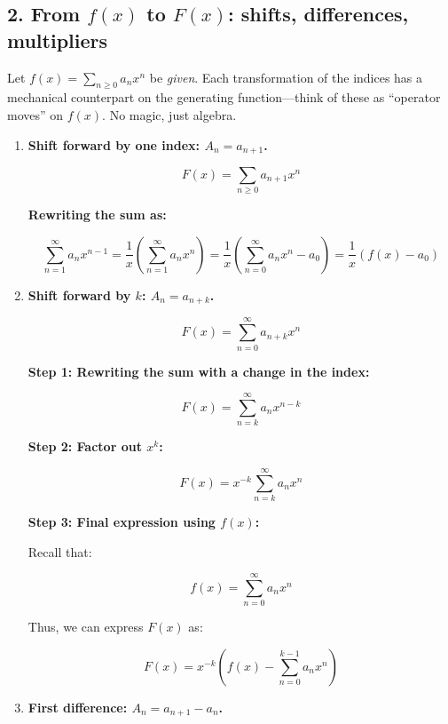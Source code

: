 \documentclass[docmute]{article}
\begin{document}
\subsection*{2. From $f(x)$ to $F(x)$: shifts, differences, multipliers}

Let $f(x)=\sum_{n\ge0} a_{n}x^{n}$ be \emph{given}.  Each transformation of the
indices has a mechanical counterpart on the generating function—think of these
as “operator moves” on $f(x)$.  No magic, just algebra.

\begin{enumerate}[label=\textbf{2(\alph*)}\quad]

\item \textbf{Shift forward by one index: $A_{n}=a_{n+1}$.}

\[
F(x) = \sum_{n \geq 0} a_{n+1} x^n
\]

\textbf{Rewriting the sum as:}

\[
\sum_{n=1}^{\infty} a_n x^{n-1} = \frac{1}{x} \left( \sum_{n=1}^{\infty} a_n x^n \right) = \frac{1}{x} \left( \sum_{n=0}^{\infty} a_n x^n - a_0 \right)= \frac{1}{x} \left( f(x) - a_0 \right)
\]

\medskip\item \textbf{Shift forward by $k$: $A_{n}=a_{n+k}$.}

\[
F(x) = \sum_{n=0}^{\infty} a_{n+k} x^n
\]

\textbf{Step 1: Rewriting the sum with a change in the index:}

\[
F(x) = \sum_{n=k}^{\infty} a_n x^{n-k}
\]

\textbf{Step 2: Factor out \(x^k\):}

\[
F(x) = x^{-k} \sum_{n=k}^{\infty} a_n x^n
\]

\textbf{Step 3: Final expression using \(f(x)\):}

Recall that:

\[
f(x) = \sum_{n=0}^{\infty} a_n x^n
\]

Thus, we can express \(F(x)\) as:

\[
F(x) = x^{-k} \left( f(x) - \sum_{n=0}^{k-1} a_n x^n \right)
\]

\medskip\item \textbf{First difference: $A_{n}=a_{n+1}-a_{n}$.}



\end{enumerate}
\end{document}
